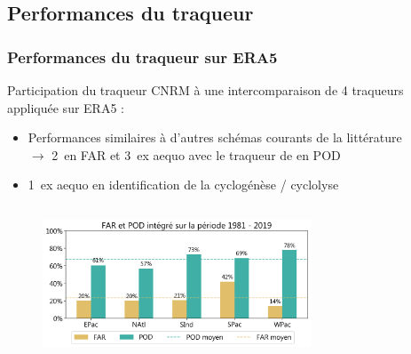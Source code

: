 \documentclass[aspectratio=169, usepdftitle=false, xcolor={dvipsnames}, 9pt,table]{beamer}
\begin{document}
 \subsection*{Performances du traqueur}
 \begin{frame}[t]
     \frametitle{Performances du traqueur sur ERA5}
     \footnotesize
     \begin{examples}    
         Participation du traqueur CNRM à une \alert{intercomparaison} de 4 traqueurs appliquée sur ERA5 \parencite{bourdin_intercomparison_2022} :
         \tcblower
         \begin{itemize}
             \item Performances similaires à d'autres schémas courants de la littérature\\
                 $\longrightarrow$ 2\ieme~en FAR et 3\ieme~ex aequo avec le traqueur de \cite{zarzycki_assessing_2017} en POD
            \item 1\ier~ex aequo en identification de la cyclogénèse / cyclolyse
         \end{itemize}
     \end{examples}
     \pause
     \begin{columns}
         \begin{column}{0.56\textwidth}
         \footnotesize
         \vspace{-1.5em}
         \begin{figure}
             \centering
             \includegraphics[height=3.8cm]{Figures/far_pod.png}

\end{figure}
\end{column}
\end{columns}
\end{frame}
\end{document}
